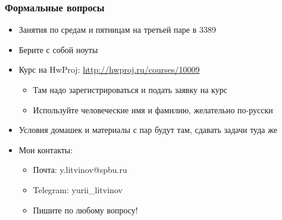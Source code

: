 \documentclass{../../slides-style}
\begin{document}
    \begin{frame}[plain]
        \titlepage
    \end{frame}

    \begin{frame}
        \frametitle{Формальные вопросы}
        \begin{itemize}
            \item Занятия по средам и пятницам на третьей паре в 3389
            \item Берите с собой ноуты
            \item Курс на HwProj: \url{http://hwproj.ru/courses/10009}
            \begin{itemize}
                \item Там надо зарегистрироваться и подать заявку на курс
                \item Используйте человеческие имя и фамилию, желательно по-русски
            \end{itemize}
            \item Условия домашек и материалы с пар будут там, сдавать задачи туда же
            \item Мои контакты:
            \begin{itemize}
                \item Почта: y.litvinov@spbu.ru
                \item Telegram: yurii\_litvinov
                \item Пишите по любому вопросу!
            \end{itemize}
        \end{itemize}
    \end{frame}
\end{document}
